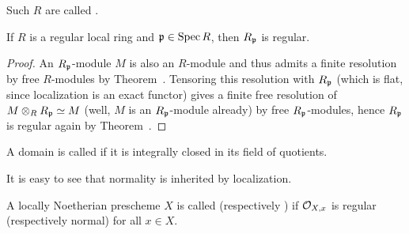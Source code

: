 \documentclass[a4paper,parskip=half,numbers=enddot, DIV=12]{scrreprt}
\begin{document}
\begin{defi} 
    Such $R$ are called .
\end{defi}
\begin{cor}
    If $R$ is a regular local ring and $\mathfrak{p}\in \operatorname{Spec} R$, then $R_{\mathfrak{p}}$ is regular.
\end{cor}
\begin{proof}
	An $R_{\mathfrak{p}}$-module $M$ is also an $R$-module and thus admits a finite resolution by free $R$-modules by Theorem~. Tensoring this resolution with $R_{\mathfrak{p}}$ (which is flat, since localization is an exact functor) gives a finite free resolution of $M\otimes_RR_{\mathfrak{p}}\simeq M$ (well, $M$ is an $R_{\mathfrak{p}}$-module already) by free $R_{\mathfrak{p}}$-modules, hence $R_{\mathfrak{p}}$ is regular again by Theorem~.
\end{proof} 
\begin{defi}
    A domain is called  if it is integrally closed in its field of quotients.
\end{defi}
 It is easy to see that normality is inherited by localization. 
\begin{defi}
    A locally Noetherian prescheme $X$ is called  (respectively ) if $\mathcal{O}_{X,x}$ is regular (respectively normal) for all $x\in X$.
\end{defi}
\end{document}
